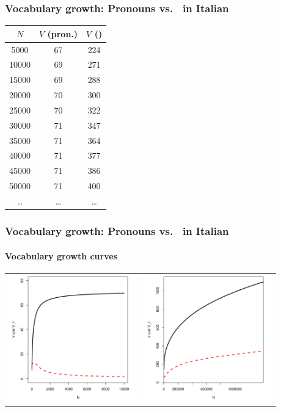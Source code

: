 \documentclass[handout,notes=show,t]{beamer} %
\begin{document}
\begin{frame}
  \frametitle{Vocabulary growth: Pronouns vs.\ \textcite{ri-} in Italian}

  \begin{center}
    \begin{tabular}{c||c|c}
      $N$ & $V$ (pron.) & $V$ (\textcite{ri-}) \\
      \hline
       \phantom{0}5000 & 67 & 224 \\
       10000 & 69 & 271 \\
       15000 & 69 & 288 \\
       20000 & 70 & 300 \\
       25000 & 70 & 322 \\
       30000 & 71 & 347 \\
       35000 & 71 & 364 \\
       40000 & 71 & 377 \\
       45000 & 71 & 386 \\
       50000 & 71 & 400 \\
       \ldots & \ldots & \ldots
    \end{tabular}
  \end{center}
\end{frame}

\begin{frame}
  \frametitle{Vocabulary growth: Pronouns vs.\ \textcite{ri-} in Italian}
  \framesubtitle{Vocabulary growth curves}

  \hspace{-1cm}%
  \begin{tabular}{cc}
    \includegraphics[height=55mm]{img/pro-sub-bin-vgc} &
    \includegraphics[height=55mm]{img/ita-ri-vgc}
  \end{tabular}
\end{frame}
\end{document}
